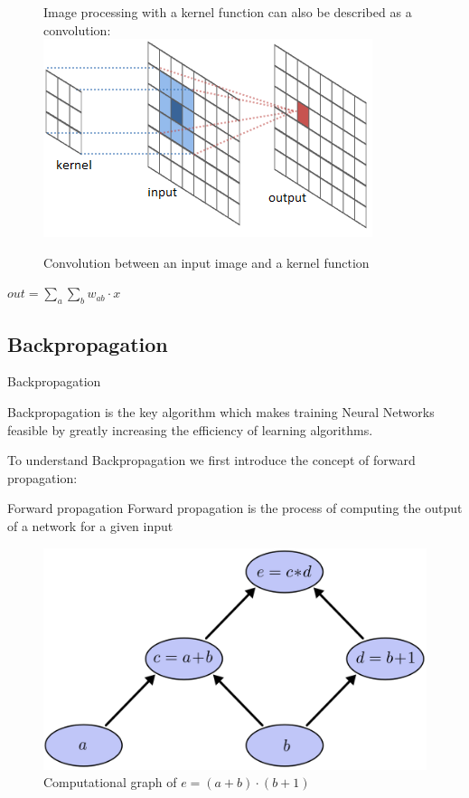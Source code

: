 \documentclass[12pt]{beamer}
\begin{document}
\begin{frame}

\begin{figure}
\centering
Image processing with a kernel function can also be described as a convolution:
\includegraphics[width = 0.4\linewidth]{images/Kernelfunction.png}
\caption{Convolution between an input image and a kernel function}
\label{fig:principle}
\end{figure}

$out = \sum_{a} \sum_{b} w_{ab} \cdot x $



\end{frame}



\subsection{Backpropagation}
\begin{frame}{Backpropagation}

Backpropagation is the key algorithm which makes training Neural Networks feasible by greatly increasing the efficiency of learning algorithms.

To understand Backpropagation we first introduce the concept of forward propagation:

\end{frame}


\begin{frame}{Forward propagation}
Forward propagation is  the process of computing the output of a network for a given input



\begin{figure}
\centering
\includegraphics[width = 0.4\linewidth]{images/backprop1.png}
\caption{Computational graph of $e = (a+b)\cdot (b+1)$}

\label{fig:propagation}
\end{figure}
\end{frame}
\end{document}
